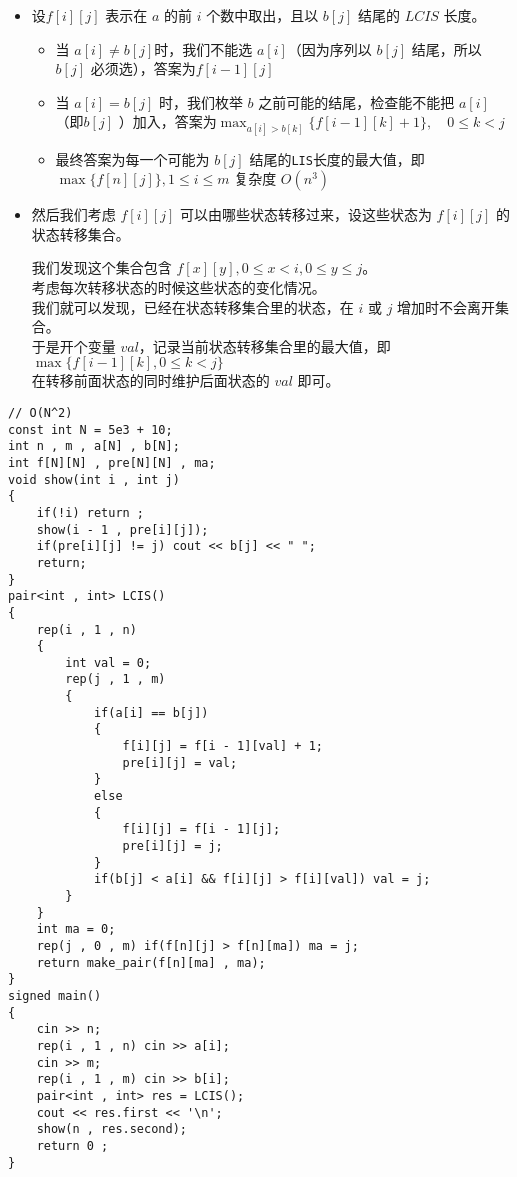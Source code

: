 \documentclass[C:/Users/12748/Desktop/latex模板/main/main.tex]{subfiles}
\begin{document}
\begin{itemize}
\item
  设\(f[i][j]\) 表示在 \(a\) 的前 \(i\) 个数中取出，且以 \(b[j]\) 结尾的
  \(LCIS\) 长度。

  \begin{itemize}
  \item
    当 \(a[i] \ne b[j]\)时，我们不能选 \(a[i]\)（因为序列以 \(b[j]\)
    结尾，所以 \(b[j]\) 必须选），答案为\(f[i-1][j]\)
  \item
    当 \(a[i] = b[j]\) 时，我们枚举 \(b\) 之前可能的结尾，检查能不能把
    \(a[i]\)（即\(b[j]\)
    ）加入，答案为\(\displaystyle \max_{a[i] > b[k]} \{f[i-1][k]+1\},\quad 0 \leq k < j\)
  \item
    最终答案为每一个可能为 \(b[j]\)
    结尾的\texttt{LIS}长度的最大值，即\(\max \{f[n][j]\}  ,1 \leq i \leq m\)
    复杂度 \(O(n^3)\)
  \end{itemize}
\item
  然后我们考虑 \(f[i][j]\) 可以由哪些状态转移过来，设这些状态为
  \(f[i][j]\) 的状态转移集合。

  我们发现这个集合包含 \(f[x][y], 0 \le x < i, 0 \le y \le j\)。\\
  考虑每次转移状态的时候这些状态的变化情况。\\
  我们就可以发现，已经在状态转移集合里的状态，在 \(i\) 或 \(j\)
  增加时不会离开集合。\\
  于是开个变量 \(val\)，记录当前状态转移集合里的最大值，即
  \(\max \{f[i-1][k], 0 \le k < j\}\)\\
  在转移前面状态的同时维护后面状态的 \(val\) 即可。
\end{itemize}

\begin{lstlisting}
// O(N^2)
const int N = 5e3 + 10;
int n , m , a[N] , b[N];
int f[N][N] , pre[N][N] , ma;
void show(int i , int j)
{
	if(!i) return ;
	show(i - 1 , pre[i][j]);
	if(pre[i][j] != j) cout << b[j] << " "; 
	return;
}
pair<int , int> LCIS()
{
	rep(i , 1 , n)
	{
		int val = 0;
		rep(j , 1 , m)
		{
			if(a[i] == b[j])
			{
				f[i][j] = f[i - 1][val] + 1;
				pre[i][j] = val;
			}
			else
			{
				f[i][j] = f[i - 1][j];
				pre[i][j] = j;
			}
			if(b[j] < a[i] && f[i][j] > f[i][val]) val = j;
		}
	}
	int ma = 0;
	rep(j , 0 , m) if(f[n][j] > f[n][ma]) ma = j; 
	return make_pair(f[n][ma] , ma);
}
signed main()
{
	cin >> n;
	rep(i , 1 , n) cin >> a[i];
	cin >> m;
	rep(i , 1 , m) cin >> b[i];
	pair<int , int> res = LCIS();
	cout << res.first << '\n';
	show(n , res.second);
	return 0 ;
}
\end{lstlisting}
\end{document}
